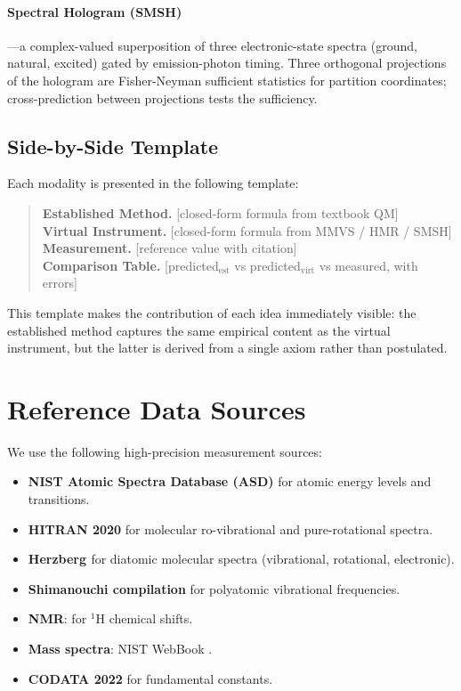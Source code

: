 \documentclass[twocolumn,11pt,a4paper]{article}
\theoremstyle{stmtstyle}
\theoremstyle{definition}
\theoremstyle{remark}
\begin{document}
\paragraph{Spectral Hologram (SMSH)}---a complex-valued superposition of three electronic-state spectra (ground, natural, excited) gated by emission-photon timing. Three orthogonal projections of the hologram are Fisher-Neyman sufficient statistics for partition coordinates; cross-prediction between projections tests the sufficiency.

\subsection{Side-by-Side Template}

Each modality is presented in the following template:

\begin{quote}\small
\textbf{Established Method.} [closed-form formula from textbook QM]\\
\textbf{Virtual Instrument.} [closed-form formula from MMVS / HMR / SMSH]\\
\textbf{Measurement.} [reference value with citation]\\
\textbf{Comparison Table.} [predicted$_{\mathrm{est}}$ vs predicted$_{\mathrm{virt}}$ vs measured, with errors]
\end{quote}

This template makes the contribution of each idea immediately visible: the established method captures the same empirical content as the virtual instrument, but the latter is derived from a single axiom rather than postulated.

\section{Reference Data Sources}
\label{sec:sources}

We use the following high-precision measurement sources:
\begin{itemize}[nosep]
\item \textbf{NIST Atomic Spectra Database (ASD)} \citep{nistasd2023} for atomic energy levels and transitions.
\item \textbf{HITRAN 2020} \citep{hitran2020} for molecular ro-vibrational and pure-rotational spectra.
\item \textbf{Herzberg \citep{herzberg1944,herzberg1950}} for diatomic molecular spectra (vibrational, rotational, electronic).
\item \textbf{Shimanouchi compilation} \citep{shimanouchi1972} for polyatomic vibrational frequencies.
\item \textbf{NMR}: \citet{harris2002} for $^{1}$H chemical shifts.
\item \textbf{Mass spectra}: NIST WebBook \citep{nistwebbook}.
\item \textbf{CODATA 2022} \citep{codata2022} for fundamental constants.
\end{itemize}
\end{document}
